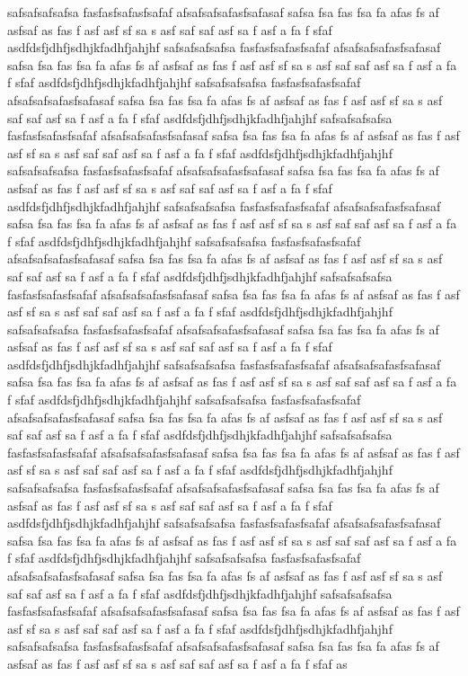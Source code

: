 safsafsafsafsa
fasfasfsafasfsafaf
afsafsafsafasfsafasaf safsa fsa fas fsa fa afas fs af asfsaf as fas f asf asf sf sa s asf saf saf asf sa f asf a fa f sfaf asdfdsfjdhfjsdhjkfadhfjahjhf
safsafsafsafsa
fasfasfsafasfsafaf
afsafsafsafasfsafasaf safsa fsa fas fsa fa afas fs af asfsaf as fas f asf asf sf sa s asf saf saf asf sa f asf a fa f sfaf asdfdsfjdhfjsdhjkfadhfjahjhf
safsafsafsafsa
fasfasfsafasfsafaf
afsafsafsafasfsafasaf safsa fsa fas fsa fa afas fs af asfsaf as fas f asf asf sf sa s asf saf saf asf sa f asf a fa f sfaf asdfdsfjdhfjsdhjkfadhfjahjhf
safsafsafsafsa
fasfasfsafasfsafaf
afsafsafsafasfsafasaf safsa fsa fas fsa fa afas fs af asfsaf as fas f asf asf sf sa s asf saf saf asf sa f asf a fa f sfaf asdfdsfjdhfjsdhjkfadhfjahjhf
safsafsafsafsa
fasfasfsafasfsafaf
afsafsafsafasfsafasaf safsa fsa fas fsa fa afas fs af asfsaf as fas f asf asf sf sa s asf saf saf asf sa f asf a fa f sfaf asdfdsfjdhfjsdhjkfadhfjahjhf
safsafsafsafsa
fasfasfsafasfsafaf
afsafsafsafasfsafasaf safsa fsa fas fsa fa afas fs af asfsaf as fas f asf asf sf sa s asf saf saf asf sa f asf a fa f sfaf asdfdsfjdhfjsdhjkfadhfjahjhf
safsafsafsafsa
fasfasfsafasfsafaf
afsafsafsafasfsafasaf safsa fsa fas fsa fa afas fs af asfsaf as fas f asf asf sf sa s asf saf saf asf sa f asf a fa f sfaf asdfdsfjdhfjsdhjkfadhfjahjhf
safsafsafsafsa
fasfasfsafasfsafaf
afsafsafsafasfsafasaf safsa fsa fas fsa fa afas fs af asfsaf as fas f asf asf sf sa s asf saf saf asf sa f asf a fa f sfaf asdfdsfjdhfjsdhjkfadhfjahjhf
safsafsafsafsa
fasfasfsafasfsafaf
afsafsafsafasfsafasaf safsa fsa fas fsa fa afas fs af asfsaf as fas f asf asf sf sa s asf saf saf asf sa f asf a fa f sfaf asdfdsfjdhfjsdhjkfadhfjahjhf
safsafsafsafsa
fasfasfsafasfsafaf
afsafsafsafasfsafasaf safsa fsa fas fsa fa afas fs af asfsaf as fas f asf asf sf sa s asf saf saf asf sa f asf a fa f sfaf asdfdsfjdhfjsdhjkfadhfjahjhf
safsafsafsafsa
fasfasfsafasfsafaf
afsafsafsafasfsafasaf safsa fsa fas fsa fa afas fs af asfsaf as fas f asf asf sf sa s asf saf saf asf sa f asf a fa f sfaf asdfdsfjdhfjsdhjkfadhfjahjhf
safsafsafsafsa
fasfasfsafasfsafaf
afsafsafsafasfsafasaf safsa fsa fas fsa fa afas fs af asfsaf as fas f asf asf sf sa s asf saf saf asf sa f asf a fa f sfaf asdfdsfjdhfjsdhjkfadhfjahjhf
safsafsafsafsa
fasfasfsafasfsafaf
afsafsafsafasfsafasaf safsa fsa fas fsa fa afas fs af asfsaf as fas f asf asf sf sa s asf saf saf asf sa f asf a fa f sfaf asdfdsfjdhfjsdhjkfadhfjahjhf
safsafsafsafsa
fasfasfsafasfsafaf
afsafsafsafasfsafasaf safsa fsa fas fsa fa afas fs af asfsaf as fas f asf asf sf sa s asf saf saf asf sa f asf a fa f sfaf asdfdsfjdhfjsdhjkfadhfjahjhf
safsafsafsafsa
fasfasfsafasfsafaf
afsafsafsafasfsafasaf safsa fsa fas fsa fa afas fs af asfsaf as fas f asf asf sf sa s asf saf saf asf sa f asf a fa f sfaf asdfdsfjdhfjsdhjkfadhfjahjhf
safsafsafsafsa
fasfasfsafasfsafaf
afsafsafsafasfsafasaf safsa fsa fas fsa fa afas fs af asfsaf as fas f asf asf sf sa s asf saf saf asf sa f asf a fa f sfaf asdfdsfjdhfjsdhjkfadhfjahjhf
safsafsafsafsa
fasfasfsafasfsafaf
afsafsafsafasfsafasaf safsa fsa fas fsa fa afas fs af asfsaf as fas f asf asf sf sa s asf saf saf asf sa f asf a fa f sfaf as
